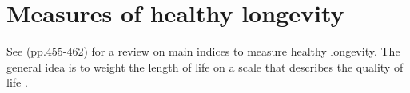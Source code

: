 \documentclass[\main/main.tex]{subfiles}
\begin{document}
\chapter{Measures of healthy longevity}

See \cite{Siegel2012} (pp.455-462) for a review on main indices to measure healthy longevity. The general idea is to weight the length of life on a scale that describes the quality of life \citep{Caswell2018}.
\end{document}
